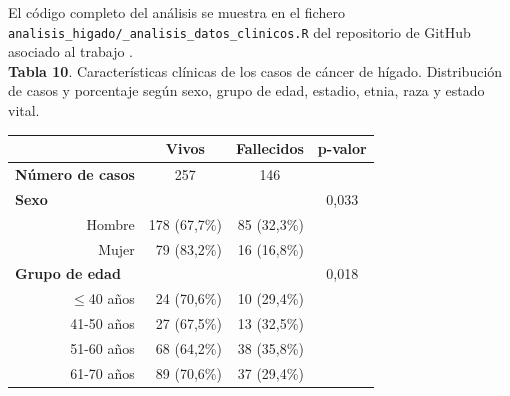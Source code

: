 El código completo del análisis se muestra en el fichero \texttt{analisis\_higado/\_analisis\_datos\_clinicos.R} del repositorio de GitHub asociado al trabajo \cite{Redondo-Sanchez2020}.\\

\textbf{Tabla 10}. Características clínicas de los casos de cáncer de hígado. Distribución de casos y porcentaje según sexo, grupo de edad, estadio, etnia, raza y estado vital.

\begin{table}[H]
	\centering
	\begin{tabular}{rrrc}
		\cline{2-4}
		\multicolumn{1}{l}{}                           & \multicolumn{1}{c}{\textbf{Vivos}} & \multicolumn{1}{c}{\textbf{Fallecidos}} & \multicolumn{1}{l}{\textbf{p-valor}} \\ \hline
		\multicolumn{1}{l}{\textbf{Número de casos}} & \multicolumn{1}{c}{257}            & \multicolumn{1}{c}{146}     & \multicolumn{1}{l}{}                     \\ \hline
		\multicolumn{1}{l}{\textbf{Sexo}}              &                           &                             & 0,033                                    \\
		Hombre                                         & 178 (67,7\%)              & 85 (32,3\%)                 &                                          \\
		Mujer                                          & 79 (83,2\%)               & 16 (16,8\%)                 &                                          \\ \hline
		\multicolumn{1}{l}{\textbf{Grupo de edad}}     &                           &                             & 0,018                                    \\
		$\leq$40 años                                      & 24 (70,6\%)               & 10 (29,4\%)                 &                                          \\
		41-50 años                                     & 27 (67,5\%)               & 13 (32,5\%)                 &                                          \\
		51-60 años                                     & 68 (64,2\%)               & 38 (35,8\%)                 &                                          \\
		61-70 años                                     & 89 (70,6\%)               & 37 (29,4\%)                 &                                          \\

\end{tabular}
\end{table}
